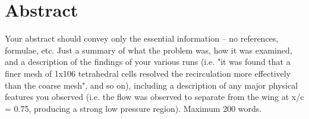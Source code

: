 \section*{Abstract}

\ind Your abstract should convey only the essential information – no references, formulae, etc. Just a summary of what the problem was, how it was examined, and a description of the findings of your various runs (i.e. "it was found that a finer mesh of 1x106 tetrahedral cells resolved the recirculation more effectively than the coarse mesh", and so on), including a description of any major physical features you observed (i.e. the flow was observed to separate from the wing at x/c = 0.75, producing a strong low pressure region). Maximum 200 words. 